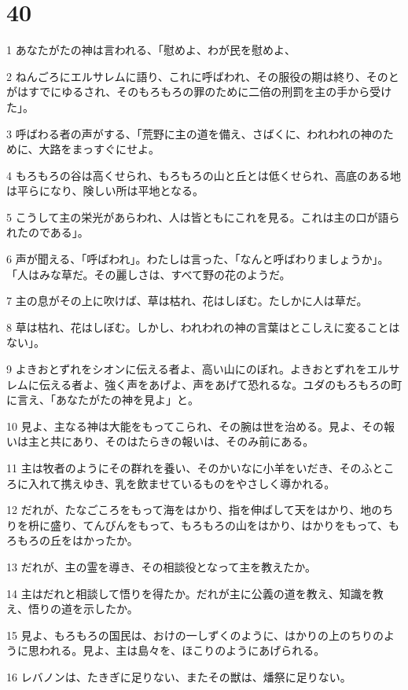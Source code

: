 \chapter{40}

\par 1 あなたがたの神は言われる、「慰めよ、わが民を慰めよ、
\par 2 ねんごろにエルサレムに語り、これに呼ばわれ、その服役の期は終り、そのとがはすでにゆるされ、そのもろもろの罪のために二倍の刑罰を主の手から受けた」。
\par 3 呼ばわる者の声がする、「荒野に主の道を備え、さばくに、われわれの神のために、大路をまっすぐにせよ。
\par 4 もろもろの谷は高くせられ、もろもろの山と丘とは低くせられ、高底のある地は平らになり、険しい所は平地となる。
\par 5 こうして主の栄光があらわれ、人は皆ともにこれを見る。これは主の口が語られたのである」。
\par 6 声が聞える、「呼ばわれ」。わたしは言った、「なんと呼ばわりましょうか」。「人はみな草だ。その麗しさは、すべて野の花のようだ。
\par 7 主の息がその上に吹けば、草は枯れ、花はしぼむ。たしかに人は草だ。
\par 8 草は枯れ、花はしぼむ。しかし、われわれの神の言葉はとこしえに変ることはない」。
\par 9 よきおとずれをシオンに伝える者よ、高い山にのぼれ。よきおとずれをエルサレムに伝える者よ、強く声をあげよ、声をあげて恐れるな。ユダのもろもろの町に言え、「あなたがたの神を見よ」と。
\par 10 見よ、主なる神は大能をもってこられ、その腕は世を治める。見よ、その報いは主と共にあり、そのはたらきの報いは、そのみ前にある。
\par 11 主は牧者のようにその群れを養い、そのかいなに小羊をいだき、そのふところに入れて携えゆき、乳を飲ませているものをやさしく導かれる。
\par 12 だれが、たなごころをもって海をはかり、指を伸ばして天をはかり、地のちりを枡に盛り、てんびんをもって、もろもろの山をはかり、はかりをもって、もろもろの丘をはかったか。
\par 13 だれが、主の霊を導き、その相談役となって主を教えたか。
\par 14 主はだれと相談して悟りを得たか。だれが主に公義の道を教え、知識を教え、悟りの道を示したか。
\par 15 見よ、もろもろの国民は、おけの一しずくのように、はかりの上のちりのように思われる。見よ、主は島々を、ほこりのようにあげられる。
\par 16 レバノンは、たきぎに足りない、またその獣は、燔祭に足りない。
